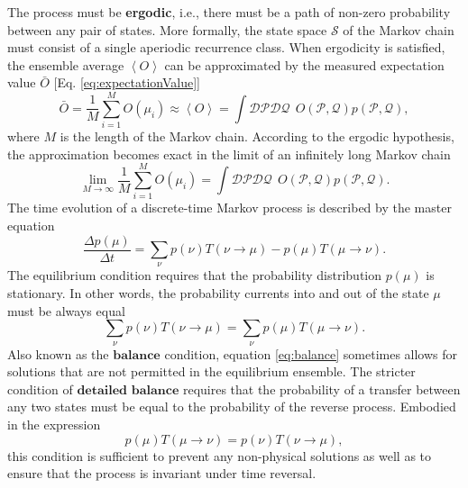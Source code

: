 \documentclass[12pt]{report}
\begin{document}
The process must be \textbf{ergodic}, i.e., there must be a path of non-zero probability between any pair of states. More formally, the state space $\mathcal{S}$ of the Markov chain must consist of a single aperiodic recurrence class. When ergodicity is satisfied, the ensemble average $\left\langle O \right\rangle$ can be approximated by the measured expectation value $\bar{O}$ [Eq. \ref{eq:expectationValue}] 
%
\begin{equation}
\label{eq:approximationOfExpectationValues}
\bar{O} = \frac{1}{M}\sum_{i = 1}^{M} O(\mu_{i}) \approx \left\langle O \right\rangle = \int \mathcal{DP}\mathcal{DQ} \:\: O(\mathcal{P},\mathcal{Q})
p(\mathcal{P},\mathcal{Q}),
\end{equation}
%
where $M$ is the length of the Markov chain. According to the ergodic hypothesis, the approximation becomes exact in the limit of an infinitely long Markov chain
%
\begin{equation}
\label{eq:ergodicHyp}
\lim_{M\rightarrow \infty}\frac{1}{M}\sum_{i = 1}^{M} O(\mu_{i}) = \int \mathcal{DP}\mathcal{DQ} \:\: O(\mathcal{P},\mathcal{Q})
p(\mathcal{P},\mathcal{Q}).
\end{equation}
%
%
The time evolution of a discrete-time Markov process is described by the master equation
%
\begin{equation}
\label{eq:MasterEquation}
\frac{\Delta p(\mu)}{\Delta t} = \sum_{\nu} p(\nu)T\left(\nu \rightarrow \mu\right) - p(\mu)T\left(\mu \rightarrow \nu\right).
\end{equation}
%
The equilibrium condition requires that the probability distribution $p(\mu)$ is stationary. In other words, the probability currents into and out of the state $\mu$ must be always equal
\begin{equation}
\label{eq:balance}
\sum_{\nu} p(\nu)T\left(\nu \rightarrow \mu\right) = \sum_{\nu} p(\mu)T\left(\mu \rightarrow \nu\right).
\end{equation}
%
Also known as the $\textbf{balance}$ condition, equation \ref{eq:balance} sometimes allows for solutions that are not permitted in the equilibrium ensemble. The stricter condition of $\textbf{detailed balance}$ requires that the probability of a transfer between any two states must be equal to the probability of the reverse process. Embodied in the expression
%
\begin{equation}
\label{eq:detailedBalance}
p(\mu)T\left(\mu \rightarrow \nu\right) = p(\nu)T\left(\nu \rightarrow \mu\right),
\end{equation} 
%
this condition is sufficient to prevent any non-physical solutions as well as to ensure that the process is invariant under time reversal.
\end{document}
